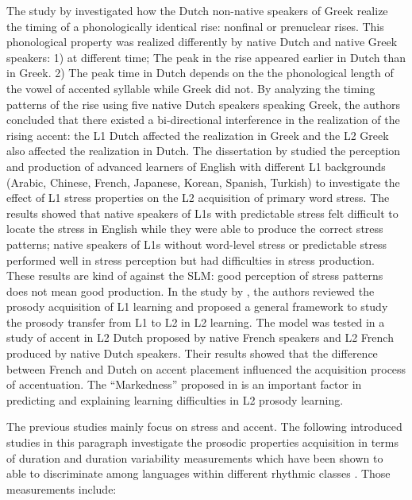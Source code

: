 The study by \cite{mennen2004bi} investigated how the Dutch non-native speakers of Greek realize the timing of a phonologically identical rise: nonfinal or prenuclear rises. This phonological property was realized differently by native Dutch and native Greek speakers: 1) at different time; The peak in the rise appeared earlier in Dutch than in Greek. 2) The peak time in Dutch depends on the the phonological length of the vowel of accented syllable while Greek did not. By analyzing the timing patterns of the rise using five native Dutch speakers speaking Greek, the authors concluded that there existed a bi-directional interference in the realization of the rising accent: the L1 Dutch affected the realization in Greek and the L2 Greek also affected the realization in Dutch. The dissertation by \cite{altmann2006perception} studied the perception and production of advanced learners of English with different L1 backgrounds (Arabic, Chinese, French, Japanese, Korean, Spanish, Turkish) to investigate the effect of L1 stress properties on the L2 acquisition of primary word stress. The results showed that native speakers of L1s with predictable stress felt difficult to locate the stress in English while they were able to produce the correct stress patterns; native speakers of L1s without word-level stress or predictable stress performed well in stress perception but had difficulties in stress production. These results are kind of against the SLM: good perception of stress patterns does not mean good production. In the study by \cite{rasier2007prosodic}, the authors reviewed the prosody acquisition of L1 learning and proposed a general framework to study the prosody transfer from L1 to L2 in L2 learning. The model was tested in a study of accent in L2 Dutch proposed by native French speakers and L2 French produced by native Dutch speakers. Their results showed that the difference between French and Dutch on accent placement influenced the acquisition process of accentuation. The ``Markedness'' proposed in \cite{eckman1977markedness} is an important factor in predicting and explaining learning difficulties in L2 prosody learning.

The previous studies mainly focus on stress and accent. The following introduced studies in this paragraph investigate the prosodic properties acquisition in terms of duration and duration variability measurements which have been shown to able to discriminate among languages within different rhythmic classes \cite{ramus1999correlates,grabe2002durational}. Those measurements include:

